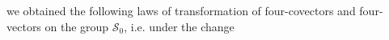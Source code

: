 \documentclass{article}
\theoremstyle{definition}
\theoremstyle{remark}
\newcommand{\er}{\eqref}
\newcommand{\er}{\eqref}
\begin{document}
\begin{comment}
we obtain the following laws of transformations under the acting in
the group $\mathcal{S}_0$:
\begin{equation}\label{fgjfjhgghhgjghjhjijhojint}
\begin{cases}
a_0=a'_0+\sum_{k=1}^{3}\frac{1}{c}\left(\sum\limits_{j=1}^{3}\frac{dA_{kj}}{dt}\left(\frac{x^0}{c}\right)\,x_j+\frac{d
z_k}{dt}\left(\frac{x^0}{c}\right)\right)\,a'_k
\\
a_j=\sum_{k=1}^{3}A_{kj}\left(\frac{x^0}{c}\right)\,a'_k\quad\quad\forall
j=1,2,3,
\end{cases}
\end{equation}
and
\begin{equation}\label{fgjfjhgghhgjgiuouoiuuint}
\begin{cases}
b'^0=b^0
\\
b'^j=\frac{1}{c}\left(\sum\limits_{k=1}^{3}\frac{dA_{jk}}{dt}\left(\frac{x^0}{c}\right)\,x_k+\frac{d
z_j}{dt}\left(\frac{x^0}{c}\right)\right)\,b^0+\sum_{k=1}^{3}A_{jk}\left(\frac{x^0}{c}\right)\,b^k\quad\quad\forall
j=1,2,3.
\end{cases}
\end{equation}
In particular, since $A(t)\in SO(3)$ and thus
\begin{equation}\label{fgjfjhgghhgjgiuouoiuu1int}
\sum_{j=1}^{3}A_{mj}(t)A_{nj}(t)=\begin{cases}1\quad\text{if}\quad m=n\\
0\quad\text{if}\quad m\neq n
\end{cases}
\quad\quad\quad\forall m,n=1,2,3,
\end{equation}
by \er{fgjfjhgghhgjghjhjijhojint} we deduce:
\begin{equation}\label{fgjfjhgghhgjghjhjijhojpiiiint}
\begin{cases}
a'_0=a_0-\sum_{k=1}^{3}\frac{1}{c}\left(\sum\limits_{j=1}^{3}\frac{dA_{kj}}{dt}\left(\frac{x^0}{c}\right)\,x_j+\frac{d
z_k}{dt}\left(\frac{x^0}{c}\right)\right)\left(\sum_{j=1}^{3}A_{kj}\left(\frac{x^0}{c}\right)\,a_j\right)
\\
a'_k=\sum_{j=1}^{3}A_{kj}\left(\frac{x^0}{c}\right)\,a_j\quad\quad\forall
k=1,2,3.
\end{cases}
\end{equation}
So, by \er{fgjfjhgghhgjghjhjijhojpiiiint} and
\er{fgjfjhgghhgjgiuouoiuuint}
\end{comment}
%
%
%
we obtained the following laws of transformation of four-covectors
and four-vectors on the group $\mathcal{S}_0$, i.e. under the change
\end{document}
